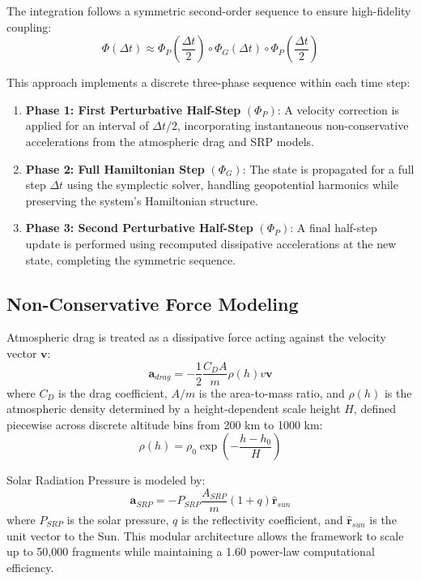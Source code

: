 \documentclass[letterpaper,11pt]{AAS}
\begin{document}
The integration follows a symmetric second-order sequence to ensure high-fidelity coupling:
\begin{equation}
    \Phi(\Delta t) \approx \Phi_P\left(\frac{\Delta t}{2}\right) \circ \Phi_G(\Delta t) \circ \Phi_P\left(\frac{\Delta t}{2}\right)
    \label{eq:strang_splitting}
\end{equation}

This approach implements a discrete three-phase sequence within each time step:
\begin{enumerate}
    \item \textbf{Phase 1: First Perturbative Half-Step} $(\Phi_P)$: A velocity correction is applied for an interval of $\Delta t/2$, incorporating instantaneous non-conservative accelerations from the atmospheric drag and SRP models.
    \item \textbf{Phase 2: Full Hamiltonian Step} $(\Phi_G)$: The state is propagated for a full step $\Delta t$ using the symplectic solver, handling geopotential harmonics while preserving the system's Hamiltonian structure.
    \item \textbf{Phase 3: Second Perturbative Half-Step} $(\Phi_P)$: A final half-step update is performed using recomputed dissipative accelerations at the new state, completing the symmetric sequence.
\end{enumerate}

\subsection{Non-Conservative Force Modeling}
Atmospheric drag is treated as a dissipative force acting against the velocity vector $\mathbf{v}$:
\begin{equation}
    \mathbf{a}_{drag} = -\frac{1}{2}\frac{C_D A}{m}\rho(h)v\mathbf{v}
    \label{eq:analytical_drag}
\end{equation}
where $C_D$ is the drag coefficient, $A/m$ is the area-to-mass ratio, and $\rho(h)$ is the atmospheric density determined by a height-dependent scale height $H$, defined piecewise across discrete altitude bins from 200 km to 1000 km:
\begin{equation}
    \rho(h) = \rho_0 \exp\left(-\frac{h - h_0}{H}\right)
    \label{eq:piecewise_density}
\end{equation}

Solar Radiation Pressure is modeled by:
\begin{equation}
    \mathbf{a}_{SRP} = -P_{SRP}\frac{A_{SRP}}{m}(1+q)\hat{\mathbf{r}}_{sun}
    \label{eq:srp_equation}
\end{equation}
where $P_{SRP}$ is the solar pressure, $q$ is the reflectivity coefficient, and $\hat{\mathbf{r}}_{sun}$ is the unit vector to the Sun. This modular architecture allows the framework to scale up to 50,000 fragments while maintaining a 1.60 power-law computational efficiency.
\end{document}
